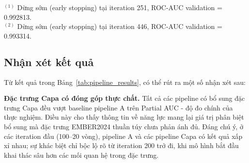 \begin{table}[h]
\centering
\caption{Kết quả so sánh các pipeline theo ROC-AUC (validation) và
AUC (test set).}
\label{tab:pipeline_results}
\vspace{4pt}
\begin{flushleft}
\small
$^{(1)}$ Dừng sớm (early stopping) tại iteration 251, ROC-AUC validation = 0.992813.\\
$^{(2)}$ Dừng sớm (early stopping) tại iteration 446, ROC-AUC validation = 0.993314.
\end{flushleft}
\end{table}

\subsection{Nhận xét kết quả}

Từ kết quả trong Bảng~\ref{tab:pipeline_results}, có thể rút ra một
số nhận xét sau:

\textbf{Đặc trưng Capa có đóng góp thực chất.}
Tất cả các pipeline có bổ sung đặc trưng Capa đều vượt baseline
pipeline A trên Partial AUC - độ đo chính của thực nghiệm. Điều
này cho thấy thông tin về năng lực mang lại giá trị phân biệt bổ sung
mà đặc trưng EMBER2024 thuần túy chưa phản ánh đủ. Đáng chú ý, ở
các iteration đầu (100--20 vòng), pipeline A và các pipeline Capa
có kết quả xấp xỉ nhau; sự khác biệt chỉ bộc lộ rõ từ iteration 200
trở đi, khi mô hình bắt đầu khai thác sâu hơn các mối quan hệ trong
đặc trưng.


